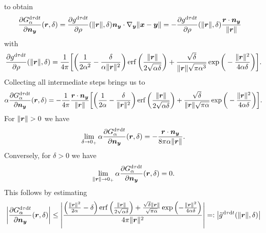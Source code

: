 \documentclass[a4paper,11pt]{article}
\begin{document}
to obtain
\begin{equation}
\label{eq:dn_G_dt_dtau}
\begin{aligned}
  \frac{\partial G^{{\mathrm{d}}\tau{\mathrm{d}} t}_\alpha}{\partial {\ensuremath{{\bm{n}}}}_{{\bm{y}}}}({{\bm{r}}},\delta) &= \frac{\partial g^{{\mathrm{d}}\tau{\mathrm{d}} t}}{\partial \rho}(\|{{\bm{r}}}\|,\delta) {{\bm{n}}}_{{\bm{y}}} \cdot \nabla_{{\bm{y}}} \|{{\bm{x}}}-{{\bm{y}}}\| 
  = - \frac{\partial g^{{\mathrm{d}}\tau{\mathrm{d}} t}}{\partial \rho}(\|{{\bm{r}}}\|,\delta) \frac{ {{\bm{r}}} \cdot {\ensuremath{{\bm{n}}}}_{{\bm{y}}}}{\| {{\bm{r}}}\|}
\end{aligned}
\end{equation}
with
\begin{equation*}
  \frac{\partial g^{{\mathrm{d}}\tau{\mathrm{d}} t}}{\partial \rho}(\|{{\bm{r}}}\|,\delta) =\frac{1}{4\pi} \bigg[  \bigg( \frac{1}{2\alpha^2} - \frac{\delta}{\alpha\|{{\bm{r}}}\|^2} \bigg) \operatorname{erf}\bigg( \frac{\|{{\bm{r}}}\|}{2\sqrt{\alpha\delta}} \bigg) + \frac{\sqrt{\delta}}{\|{{\bm{r}}}\|\sqrt{\pi\alpha^3}} \exp \bigg( -\frac{\|{{\bm{r}}}\|^2}{4\alpha\delta} \bigg) \bigg].
\end{equation*}
Collecting all intermediate steps brings us to
\begin{align*}
  \alpha\frac{\partial G^{{\mathrm{d}}\tau{\mathrm{d}} t}_\alpha}{\partial {\ensuremath{{\bm{n}}}}_{{\bm{y}}}}({{\bm{r}}},\delta) = -\frac{1}{4\pi} \frac{ {{\bm{r}}} \cdot {\ensuremath{{\bm{n}}}}_{{\bm{y}}}}{\|{{\bm{r}}}\|}\bigg[  \bigg( \frac{1}{2\alpha} - \frac{\delta}{\|{{\bm{r}}}\|^2} \bigg) \operatorname{erf}\bigg( \frac{\|{{\bm{r}}}\|}{2\sqrt{\alpha\delta}} \bigg) + \frac{\sqrt{\delta}}{\|{{\bm{r}}}\|\sqrt{\pi\alpha}} \exp \bigg( -\frac{\|{{\bm{r}}}\|^2}{4\alpha\delta} \bigg) \bigg].
\end{align*}
For $\|\vr\|>0$ we have
\begin{equation*}
  \lim_{\delta \to 0_+}  \alpha\frac{\partial G^{{\mathrm{d}}\tau{\mathrm{d}} t}_\alpha}{\partial {\ensuremath{{\bm{n}}}}_{{\bm{y}}}}({{\bm{r}}},\delta)  = -\frac{{{\bm{r}}} \cdot {\ensuremath{{\bm{n}}}}_{{\bm{y}}}}{8 \pi\alpha \| {{\bm{r}}}\|}.
\end{equation*}
Conversely, for $\delta > 0$ we have
\begin{equation*} 
  \lim_{\|{{\bm{r}}}\| \to 0_+} \alpha\frac{\partial G^{{\mathrm{d}}\tau{\mathrm{d}} t}_\alpha}{\partial {\ensuremath{{\bm{n}}}}_{{\bm{y}}}}({{\bm{r}}},\delta) = 0.
\end{equation*}
This follows by estimating 
\begin{equation*}
	\left| \frac{\partial G_\alpha^{{\mathrm{d}}\tau {\mathrm{d}} t}}{\partial {\ensuremath{{\bm{n}}}}_{{\bm{y}}}}
	({{\bm{r}}}, \delta) \right| 
	\leq \left| 
	\frac{\left(\frac{\| {{\bm{r}}} \|^2}{2\alpha} - \delta \right)
	\operatorname{erf}\left(\frac{\| {{\bm{r}}} \|}{2\sqrt{\alpha\delta}}  \right)
	+ \frac{\sqrt{\delta} \| {{\bm{r}}} \|}{\sqrt{\pi\alpha}} 
	\exp \left( -\frac{\| {{\bm{r}}}\|^2}{4\alpha \delta} \right)}
	{4 \pi \| {{\bm{r}}}\|^2 }
	 \right| =: \big|\tilde g^{{\mathrm{d}} \tau {\mathrm{d}} t}(\|{{\bm{r}}} \|, \delta)\big|
\end{equation*}
\end{document}
